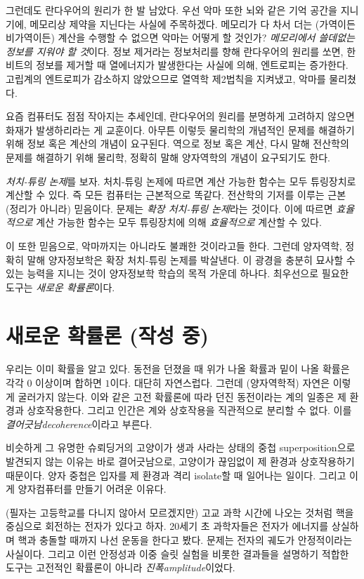 \documentclass[a4paper,chapter,atbegshi]{oblivoir}
\begin{document}
그런데도 란다우어의 원리가 한 발 남았다. 우선 악마 또한 뇌와 같은 기억 공간을
지니기에, 메모리상 제약을 지닌다는 사실에 주목하겠다. 메모리가 다 차서
더는 (가역이든 비가역이든) 계산을 수행할 수 없으면 악마는 어떻게 할 것인가?
\emph{메모리에서 쓸데없는 정보를 지워야 할 것}이다. 정보 제거라는 정보처리를
향해 란다우어의 원리를 쏘면, 한 비트의 정보를 제거할 때 열에너지가 발생한다는
사실에 의해, 엔트로피는 증가한다. 고립계의 엔트로피가 감소하지 않았으므로
열역학 제2법칙을 지켜냈고, 악마를 물리쳤다. 

요즘 컴퓨터도 점점 작아지는 추세인데, 란다우어의 원리를 분명하게 고려하지
않으면 화재가 발생하리라는 게 교훈이다. 아무튼 이렇듯 물리학의 개념적인 문제를
해결하기 위해 정보 혹은 계산의 개념이 요구된다. 역으로 정보 혹은 계산, 다시 말해
전산학의 문제를 해결하기 위해 물리학, 정확히 말해 양자역학의 개념이 요구되기도
한다. 

\emph{처치-튜링 논제}를 보자. 처치-튜링 논제에 따르면 계산 가능한 함수는 모두
튜링장치로 계산할 수 있다. 즉 모든 컴퓨터는 근본적으로 똑같다. 전산학의
기저를 이루는 근본 (정리가 아니라) 믿음이다. 문제는 \emph{확장 처치-튜링 논제}라는
것이다. 이에 따르면 \emph{효율적으로} 계산 가능한 함수는 모두 튜링장치에 의해
\emph{효율적으로} 계산할 수 있다. 

이 또한 믿음으로, 악마까지는 아니라도 불쾌한 것이라고들 한다. 그런데 양자역학,
정확히 말해 양자정보학은 확장 처치-튜링 논제를 박살낸다. 이 광경을 충분히 묘사할
수 있는 능력을 지니는 것이 양자정보학 학습의 목적 가운데 하나다. 최우선으로 필요한
도구는 \emph{새로운 확률론}이다. 

\chapter{새로운 확률론 (작성 중)} 
우리는 이미 확률을 알고 있다. 동전을 던졌을 때 위가 나올 확률과 밑이 나올 확률은
각각 $0$ 이상이며 합하면 $1$이다. 대단히 자연스럽다. 그런데 (양자역학적) 자연은
이렇게 굴러가지 않는다. 이와 같은 고전 확률론에 따라 던진 동전이라는 계의 일종은
제 환경과 상호작용한다. 그리고 인간은 계와 상호작용을 직관적으로 분리할 수 없다.
이를 \emph{결어긋남\tiny decoherence}이라고 부른다.

비슷하게 그 유명한 슈뢰딩거의 고양이가 생과 사라는 상태의 중첩{\tiny
superposition}으로 발견되지 않는 이유는 바로 결어긋남으로, 고양이가 끊임없이
제 환경과 상호작용하기 때문이다. 양자 중첩은 입자를 제 환경과 격리{\tiny
isolate}할 때 일어나는 일이다. 그리고 이게 양자컴퓨터를 만들기 어려운 이유다.

(필자는 고등학교를 다니지 않아서 모르겠지만) 고교 과학 시간에 나오는 것처럼
핵을 중심으로 회전하는 전자가 있다고 하자. 20세기 초 과학자들은 전자가 에너지를
상실하며 핵과 충돌할 때까지 나선 운동을 한다고 봤다. 문제는 전자의 궤도가
안정적이라는 사실이다. 그리고 이런 안정성과 이중 슬릿 실험을 비롯한 결과들을
설명하기 적합한 도구는 고전적인 확률론이 아니라 \emph{진폭\tiny amplitude}이었다.
\end{document}
